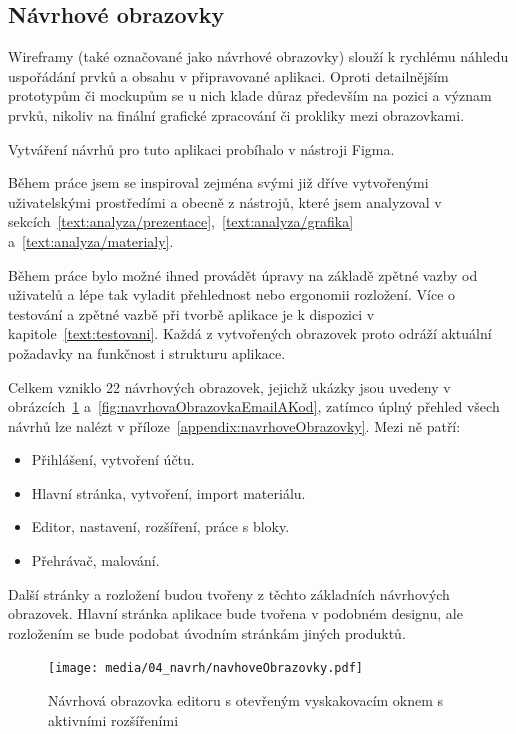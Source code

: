 \subsection{Návrhové obrazovky}

Wireframy (také označované jako návrhové obrazovky) slouží k rychlému náhledu uspořádání prvků a obsahu v připravované aplikaci. 
Oproti detailnějším prototypům či mockupům se u nich klade důraz především na pozici a význam prvků, nikoliv na finální grafické zpracování či prokliky mezi obrazovkami.

Vytváření návrhů pro tuto aplikaci probíhalo v nástroji Figma. 

Během práce jsem se inspiroval zejména svými již dříve vytvořenými uživatelskými prostředími a obecně z nástrojů, které jsem analyzoval v sekcích~\ref{text:analyza/prezentace},~\ref{text:analyza/grafika} a~\ref{text:analyza/materialy}.

Během práce bylo možné ihned provádět úpravy na základě zpětné vazby od uživatelů a lépe tak vyladit přehlednost nebo ergonomii rozložení. 
Více o testování a zpětné vazbě při tvorbě aplikace je k dispozici v kapitole~\ref{text:testovani}.
Každá z vytvořených obrazovek proto odráží aktuální požadavky na funkčnost i strukturu aplikace.


Celkem vzniklo 22 návrhových obrazovek, jejichž ukázky jsou uvedeny v obrázcích~\ref{fig:navrhovaObrazovkaRozsireni} a~\ref{fig:navrhovaObrazovkaEmailAKod}, zatímco úplný přehled všech návrhů lze nalézt v příloze~\ref{appendix:navrhoveObrazovky}.
Mezi ně patří:

\begin{itemize}
    \item Přihlášení, vytvoření účtu.
    \item Hlavní stránka, vytvoření, import materiálu.
    \item Editor, nastavení, rozšíření, práce s bloky.
    \item Přehrávač, malování.
\end{itemize}

Další stránky a rozložení budou tvořeny z těchto základních návrhových obrazovek.
Hlavní stránka aplikace bude tvořena v podobném designu, ale rozložením se bude podobat úvodním stránkám jiných produktů.

\begin{figure}[ht!]
    \centering
    \texttt{[image: media/04\_navrh/navhoveObrazovky.pdf]}
    \caption{Návrhová obrazovka editoru s otevřeným vyskakovacím oknem s aktivními rozšířeními}\label{fig:navrhovaObrazovkaRozsireni}
\end{figure}


